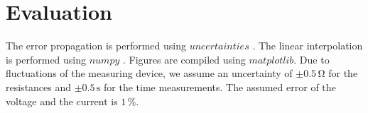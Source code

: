 \section{Evaluation}
\label{sec:Auswertung}



The error propagation is performed using $uncertainties$ \cite{unp}. The linear interpolation is performed using $numpy$ \cite{numpy}.
Figures are compiled using $matplotlib$\cite{Hunter:2007}. Due to fluctuations of the measuring device, we assume an uncertainty of
$\pm 0.5 \, \unit{\ohm}$ for the resistances and $\pm 0.5 \, \unit{\second} $ for the time measurements. 
The assumed error of the voltage and the current is $1 \, \%$.

